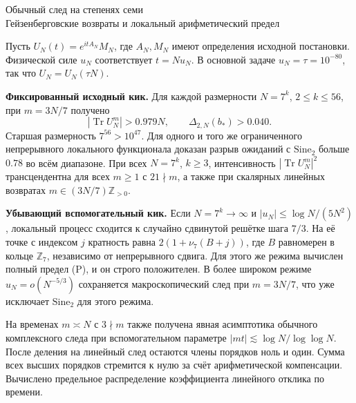 \documentclass[11pt,a4paper]{article}
\newcommand{\Tr}{\operatorname{Tr}}
\newcommand{\Z}{\mathbb Z}
\newcommand{\si}{\mathrm{Sine}_2}
\begin{document}
\begin{center}{\LARGE\sffamily Обычный след на степенях семи}\\[4pt]
{\large Гейзенберговские возвраты и локальный арифметический предел}
\end{center}
Пусть $U_N(t)=e^{itA_N}M_N$, где $A_N,M_N$ имеют определения исходной постановки. Физической силе $u_N$ соответствует $t=Nu_N$. В основной задаче $u_N=\tau=10^{-80}$, так что $U_N=U_N(\tau N)$.

\textbf{Фиксированный исходный кик.} Для каждой размерности $N=7^k$, $2\le k\le56$, при $m=3N/7$ получено
\[
      |\Tr U_N^m|>0.979N,\qquad
      \Delta_{2,N}(b_*)>0.040 .                                    \tag{1}
\]
Старшая размерность $7^{56}>10^{47}$. Для одного и того же ограниченного непрерывного локального функционала доказан разрыв ожиданий с $\si$ больше $0.78$ во всём диапазоне. При всех $N=7^k$, $k\ge3$, интенсивность $|\Tr U_N^m|^2$ трансцендентна для всех $m\ge1$ с $21\nmid m$, а также при скалярных линейных возвратах $m\in (3N/7)\Z_{>0}$.

\textbf{Убывающий вспомогательный кик.} Если $N=7^k\to\infty$ и $|u_N|\le\log N/(5N^2)$, локальный процесс сходится к случайно сдвинутой решётке шага $7/3$. На её точке с индексом $j$ кратность равна $2(1+\nu_7(B+j))$, где $B$ равномерен в кольце $\Z_7$, независимо от непрерывного сдвига. Для этого же режима вычислен полный предел (P), и он строго положителен. В более широком режиме $u_N=o(N^{-5/3})$ сохраняется макроскопический след при $m=3N/7$, что уже исключает $\si$ для этого режима.

На временах $m\asymp N$ с $3\nmid m$ также получена явная асимптотика обычного комплексного следа при вспомогательном параметре $|mt|\lesssim\log N/\log\log N$. После деления на линейный след остаются члены порядков ноль и один. Сумма всех высших порядков стремится к нулю за счёт арифметической компенсации. Вычислено предельное распределение коэффициента линейного отклика по времени.
\end{document}
